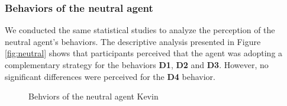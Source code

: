 \documentclass[10pt, a4paper, twocolumn]{article} %
\begin{document}
		\subsubsection{Behaviors of the neutral agent}
		
		We conducted the same statistical studies to analyze the perception of the neutral agent's behaviors. The descriptive analysis presented in Figure \ref{fig:neutral} shows that participants perceived that the agent was adopting a complementary strategy for the behaviors \textbf{D1}, \textbf{D2} and \textbf{D3}. However, no significant differences were perceived for the \textbf{D4} behavior.
		
			\begin{figure}[!tb]
				\centering
				
				\caption{Behviors of the neutral agent Kevin}
				\label{fig:neutre}
			\end{figure}
		
\end{document}
